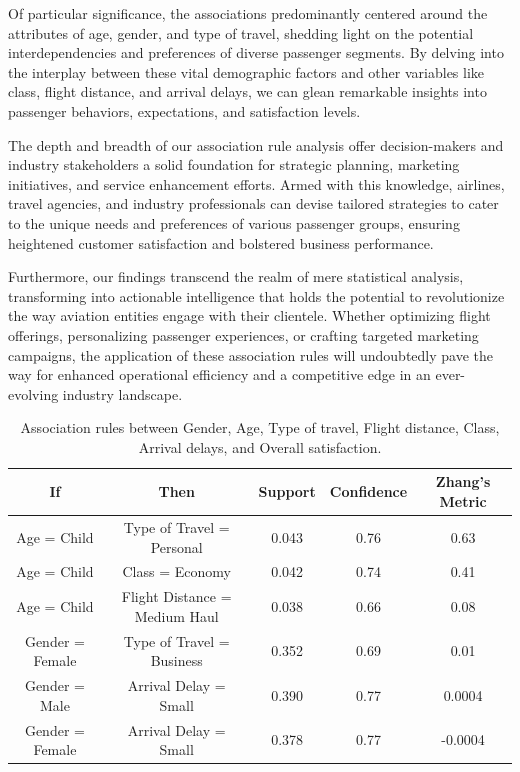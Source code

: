 \documentclass[11pt]{article}
\begin{document}
Of particular significance, the associations predominantly centered around the attributes of age, gender, and type of travel, shedding light on the potential interdependencies and preferences of diverse passenger segments. By delving into the interplay between these vital demographic factors and other variables like class, flight distance, and arrival delays, we can glean remarkable insights into passenger behaviors, expectations, and satisfaction levels.

The depth and breadth of our association rule analysis offer decision-makers and industry stakeholders a solid foundation for strategic planning, marketing initiatives, and service enhancement efforts. Armed with this knowledge, airlines, travel agencies, and industry professionals can devise tailored strategies to cater to the unique needs and preferences of various passenger groups, ensuring heightened customer satisfaction and bolstered business performance.

Furthermore, our findings transcend the realm of mere statistical analysis, transforming into actionable intelligence that holds the potential to revolutionize the way aviation entities engage with their clientele. Whether optimizing flight offerings, personalizing passenger experiences, or crafting targeted marketing campaigns, the application of these association rules will undoubtedly pave the way for enhanced operational efficiency and a competitive edge in an ever-evolving industry landscape.


\begin{table}[!h]
    \centering
    \begin{tabular}{|c|c|c|c|c|}
        \hline
        If &  Then &  Support & Confidence & Zhang's Metric \\
        \hline
        Age = Child     &   Type of Travel = Personal  &  0.043 & 0.76 & 0.63 \\
        \hline
        Age = Child     &   Class = Economy & 0.042 & 0.74 &  0.41 \\
        \hline
        Age = Child     &   Flight Distance = Medium Haul & 0.038 & 0.66 & 0.08 \\
        \hline
        Gender = Female     &   Type of Travel = Business & 0.352 & 0.69 & 0.01 \\
        \hline
        Gender = Male     &   Arrival Delay = Small  &  0.390 & 0.77 & 0.0004 \\
        \hline
        Gender = Female     &   Arrival Delay = Small  &  0.378 & 0.77 & -0.0004 \\
        \hline
    \end{tabular}
    \caption{\centering Association rules between Gender, Age, Type of travel, Flight distance, Class, Arrival delays, and Overall satisfaction.}
    \label{tab:ar}
\end{table}
\end{document}
